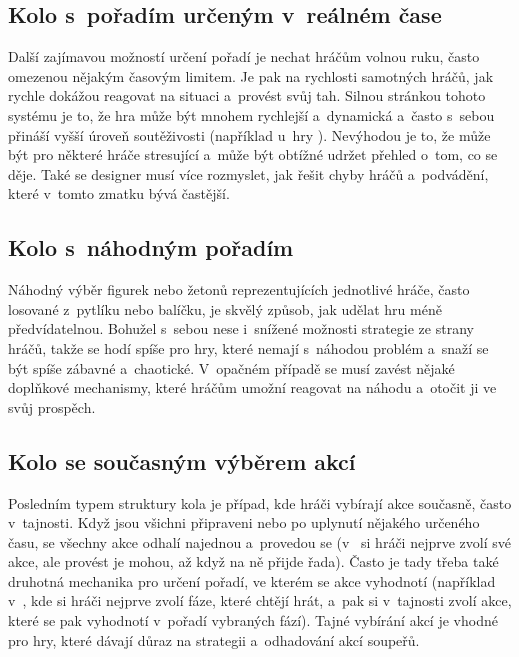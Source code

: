 \subsection{Kolo s~pořadím určeným v~reálném čase}
\label{subsec:turns_realtime_order}

Další zajímavou možností určení pořadí je nechat hráčům volnou ruku, často omezenou nějakým časovým limitem. Je pak na rychlosti samotných hráčů, jak rychle dokážou reagovat na situaci a~provést svůj tah. Silnou stránkou tohoto systému je to, že hra může být mnohem rychlejší a~dynamická a~často s~sebou přináší vyšší úroveň soutěživosti (například u~hry ). Nevýhodou je to, že může být pro některé hráče stresující a~může být obtížné udržet přehled o~tom, co se děje. Také se designer musí více rozmyslet, jak řešit chyby hráčů a~podvádění, které v~tomto zmatku bývá častější.

\subsection{Kolo s~náhodným pořadím}
\label{subsec:turns_random_order}

Náhodný výběr figurek nebo žetonů reprezentujících jednotlivé hráče, často losované z~pytlíku nebo balíčku, je skvělý způsob, jak udělat hru méně předvídatelnou. Bohužel s~sebou nese i~snížené možnosti strategie ze strany hráčů, takže se hodí spíše pro hry, které nemají s~náhodou problém a~snaží se být spíše zábavné a~chaotické. V~opačném případě se musí zavést nějaké doplňkové mechanismy, které hráčům umožní reagovat na náhodu a~otočit ji ve svůj prospěch.

\subsection{Kolo se současným výběrem akcí}
\label{subsec:turns_action_selection_order}

Posledním typem struktury kola je případ, kde hráči vybírají akce současně, často v~tajnosti. Když jsou všichni připraveni nebo po uplynutí nějakého určeného času, se všechny akce odhalí najednou a~provedou se (v~ si hráči nejprve zvolí své akce, ale provést je mohou, až když na ně přijde řada). Často je tady třeba také druhotná mechanika pro určení pořadí, ve kterém se akce vyhodnotí (například v~, kde si hráči nejprve zvolí fáze, které chtějí hrát, a~pak si v~tajnosti zvolí akce, které se pak vyhodnotí v~pořadí vybraných fází). Tajné vybírání akcí je vhodné pro hry, které dávají důraz na strategii a~odhadování akcí soupeřů.


